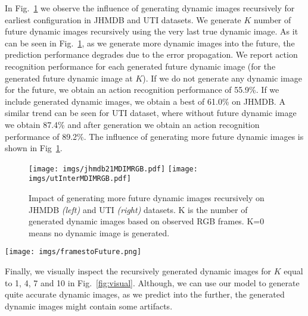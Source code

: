 In Fig.~\ref{tab:woworgbjhmdb} we observe the influence of generating dynamic images recursively for earliest configuration in JHMDB and UTI datasets. 
We generate $K$ number of future dynamic images recursively using the very last true dynamic image. 
As it can be seen in Fig.~\ref{tab:woworgbjhmdb}, as we generate more dynamic images into the future, the prediction performance degrades due to the error propagation.
We report action recognition performance for each generated future dynamic image (\ie for the generated future dynamic image at $K$).
If we do not generate any dynamic image for the future, we obtain an action recognition performance of 55.9\%.
If we include generated dynamic images, we obtain a best of 61.0\% on JHMDB. 
A similar trend can be seen for UTI dataset, where without future dynamic image we obtain 87.4\% and after generation we obtain an action recognition performance of 89.2\%.
The influence of generating more future dynamic images is shown in Fig~\ref{tab:woworgbjhmdb}.

\begin{figure}[t]
\centering
\caption{Impact of generating more future dynamic images recursively on JHMDB \textit{(left)} and UTI \textit{(right)} datasets. K is the number of generated dynamic images based on observed RGB frames. K=0 means no dynamic image is generated.}
\label{tab:woworgbjhmdb}
\texttt{[image: imgs/jhmdb21MDIMRGB.pdf]}
\texttt{[image: imgs/utInterMDIMRGB.pdf]}
\end{figure}

\begin{figure*}[t]
 \centering
 \caption{Visual comparison between generated dynamic image {\em (bottom)} and ground truth {\em (top)}. $K$ refers to how many iterations we apply in the generation of dynamic image.}
 \label{fig:visual}
 \texttt{[image: imgs/framestoFuture.png]}
\end{figure*}
Finally, we visually inspect the recursively generated dynamic images for $K$ equal to 1, 4, 7 and 10 in Fig.~\ref{fig:visual}. 
Although, we can use our model to generate quite accurate dynamic images, as we predict into the further, the generated dynamic images might contain some artifacts.
